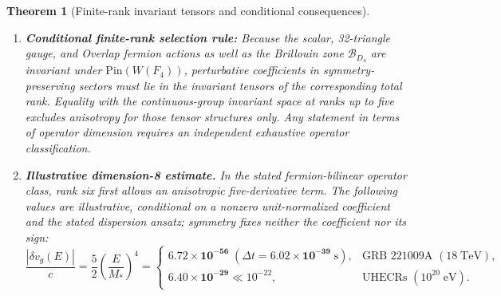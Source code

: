 \documentclass[11pt,a4paper]{article}
\newtheorem{theorem}{Theorem}[section]
\begin{document}
\begin{theorem}[Finite-rank invariant tensors and conditional consequences]
\begin{enumerate}[label=(\roman*),leftmargin=1.9em,itemsep=2pt]
\begin{equation}
D_{\mathrm{ov}}(k) = \frac{1}{\ell_*}\Bigl(\mathbb{I}_4 + \gamma_5\,\mathrm{sgn}\bigl(H_W(k)\bigr)\Bigr), \qquad
H_W(k) = \gamma_5\Bigl(\mathrm{i}\sum_{\mu=1}^4 \gamma_\mu S_\mu(k) + \frac{r_W}{2}\widehat{C}_{D_4}(k) - m_0\Bigr),
\label{eq:overlap-def}
\end{equation}
every orthogonal transformation $g \in W(F_4)$ admits an explicit Clifford spinor lift $U_g \in \mathrm{Pin}(4)$ satisfying $U_g^\dagger \gamma_\mu U_g = \sum_\nu g_{\mu\nu}\gamma_\nu$, $U_g^\dagger \gamma_5 U_g = (\det g)\gamma_5$, and exact operator covariance
\begin{equation}
U_g^\dagger\,D_{\mathrm{ov}}(g k)\,U_g = D_{\mathrm{ov}}(k) \qquad \forall\, g \in W(F_4), \;\; \forall\, k \in \mathcal{B}_{D_4}.
\label{eq:pin4-covariance}
\end{equation}
\item \textbf{Conditional finite-rank selection rule:} Because the scalar, 32-triangle gauge, and Overlap fermion actions as well as the Brillouin zone $\mathcal{B}_{D_4}$ are invariant under $\mathrm{Pin}(W(F_4))$, perturbative coefficients in symmetry-preserving sectors must lie in the invariant tensors of the corresponding total rank. Equality with the continuous-group invariant space at ranks up to five excludes anisotropy for those tensor structures only. Any statement in terms of operator dimension requires an independent exhaustive operator classification.
\item \textbf{Illustrative dimension-8 estimate.} In the stated fermion-bilinear operator class, rank six first allows an anisotropic five-derivative term. The following values are illustrative, conditional on a nonzero unit-normalized coefficient and the stated dispersion ansatz; symmetry fixes neither the coefficient nor its sign:
\begin{equation}
\frac{|\delta v_g(E)|}{c} = \frac{5}{2}\left(\frac{E}{M_*}\right)^{\!4} =
\begin{cases}
\mathbf{6.72\times 10^{-56}} \;(\Delta t = \mathbf{6.02\times 10^{-39}\;\mathrm{s}}), & \text{GRB~221009A } (18\;\mathrm{TeV}), \\[3pt]
\mathbf{6.40\times 10^{-29}} \ll 10^{-22}, & \text{UHECRs } (10^{20}\;\mathrm{eV}).
\end{cases}
\label{eq:d8-predictions}
\end{equation}
\end{enumerate}
\end{theorem}
\end{document}

